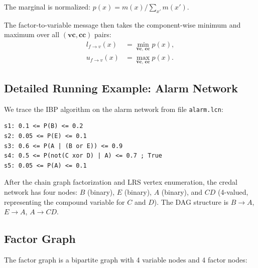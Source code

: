 \documentclass{article}
\begin{document}
\medskip
The marginal is normalized: $p(x) = m(x) / \sum_{x'} m(x')$.

The factor-to-variable message then takes the component-wise minimum and maximum
over all $(\mathbf{vc}, \mathbf{cc})$ pairs:
\begin{align*}
  l_{f \to v}(x) &= \min_{\mathbf{vc},\,\mathbf{cc}} p(x), \\
  u_{f \to v}(x) &= \max_{\mathbf{vc},\,\mathbf{cc}} p(x).
\end{align*}

\subsection{Detailed Running Example: Alarm Network}

We trace the IBP algorithm on the alarm network from file \texttt{alarm.lcn}:
\begin{verbatim}
s1: 0.1 <= P(B) <= 0.2
s2: 0.05 <= P(E) <= 0.1
s3: 0.6 <= P(A | (B or E)) <= 0.9
s4: 0.5 <= P(not(C xor D) | A) <= 0.7 ; True
s5: 0.05 <= P(A) <= 0.1
\end{verbatim}

After the chain graph factorization and LRS vertex enumeration, the credal network has
four nodes: $B$ (binary), $E$ (binary), $A$ (binary), and $CD$ (4-valued, representing
the compound variable for $C$ and $D$). The DAG structure is $B \to A$, $E \to A$,
$A \to CD$.

\subsection{Factor Graph}

The factor graph is a bipartite graph with 4 variable nodes and 4 factor nodes:

\begin{center}
\end{center}
\end{document}
